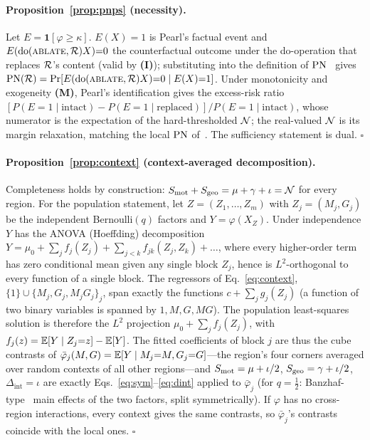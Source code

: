\paragraph{Proposition~\ref{prop:pnps} (necessity).}
Let $E=\mathbf 1[\varphi\ge\kappa]$. $E(X){=}1$ is Pearl's factual event and $E(\mathrm{do}(\textsc{ablate},\mathcal{R})X){=}0$ the counterfactual outcome under the do-operation that replaces $\mathcal{R}$'s content (valid by \textbf{(I)}); substituting into the definition of $\mathrm{PN}$~\cite{pearl2009causality} gives $\mathrm{PN}(\mathcal{R})=\Pr[E(\mathrm{do}(\textsc{ablate},\mathcal{R})X){=}0\mid E(X){=}1]$. Under monotonicity and exogeneity \textbf{(M)}, Pearl's identification gives the excess-risk ratio $[P(E{=}1\mid\text{intact})-P(E{=}1\mid\text{replaced})]/P(E{=}1\mid\text{intact})$, whose numerator is the expectation of the hard-thresholded $\mathcal{N}$; the real-valued $\mathcal{N}$ is its margin relaxation, matching the local $\mathrm{PN}$ of~\cite{watson2021lens}. The sufficiency statement is dual. $\square$

\paragraph{Proposition~\ref{prop:context} (context-averaged decomposition).}
Completeness holds by construction: $S_{\mathrm{mot}}+S_{\mathrm{geo}}=\mu+\gamma+\iota=\mathcal{N}$ for every region. For the population statement, let $Z=(Z_1,\dots,Z_m)$ with $Z_j=(M_j,G_j)$ be the independent Bernoulli$(q)$ factors and $Y=\varphi(X_Z)$. Under independence $Y$ has the ANOVA (Hoeffding) decomposition $Y=\mu_0+\sum_j f_j(Z_j)+\sum_{j<k}f_{jk}(Z_j,Z_k)+\dots$, where every higher-order term has zero conditional mean given any single block $Z_j$, hence is $L^2$-orthogonal to every function of a single block. The regressors of Eq.~\eqref{eq:context}, $\{1\}\cup\{M_j,G_j,M_jG_j\}_j$, span exactly the functions $c+\sum_j g_j(Z_j)$ (a function of two binary variables is spanned by $1,M,G,MG$). The population least-squares solution is therefore the $L^2$ projection $\mu_0+\sum_j f_j(Z_j)$, with $f_j(z)=\operatorname{\mathbb{E}}[Y\mid Z_j{=}z]-\operatorname{\mathbb{E}}[Y]$. The fitted coefficients of block $j$ are thus the cube contrasts of $\bar\varphi_j(M,G)=\operatorname{\mathbb{E}}[Y\mid M_j{=}M,G_j{=}G]$---the region's four corners averaged over random contexts of all other regions---and $S_{\mathrm{mot}}=\mu+\iota/2$, $S_{\mathrm{geo}}=\gamma+\iota/2$, $\Delta_{\mathrm{int}}=\iota$ are exactly Eqs.~\eqref{eq:sym}--\eqref{eq:dint} applied to $\bar\varphi_j$ (for $q=\tfrac12$: Banzhaf-type~\cite{banzhaf1965} main effects of the two factors, split symmetrically). If $\varphi$ has no cross-region interactions, every context gives the same contrasts, so $\bar\varphi_j$'s contrasts coincide with the local ones. $\square$

